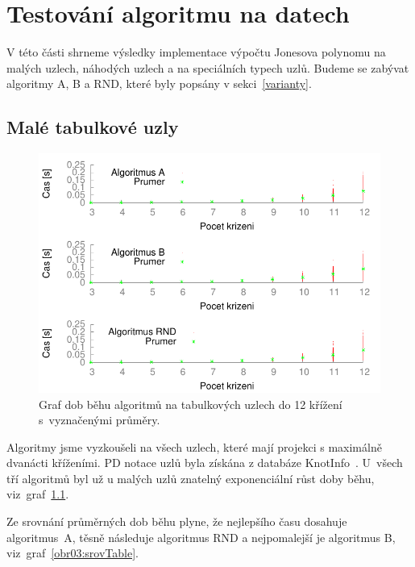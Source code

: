 
\chapter{Testování algoritmu na datech}

V této části shrneme výsledky implementace výpočtu Jonesova polynomu na malých uzlech, náhodých uzlech a na speciálních typech uzlů.
Budeme se zabývat algoritmy A, B a RND, které byly popsány v sekci~\ref{varianty}.

\section{Malé tabulkové uzly}

\begin{figure}[p]\centering
\includegraphics{../img/multiTable}
\caption{Graf dob běhu algoritmů na tabulkových uzlech do 12 křížení s~vyznačenými průměry.}
\label{obr03:multiTable}
\end{figure}

Algoritmy jsme vyzkoušeli na všech uzlech, které mají projekci s maximálně dvanácti kříženími. PD notace uzlů byla získána z databáze KnotInfo~\cite{knotinfo}.
U~všech tří algoritmů byl už u malých uzlů znatelný exponenciální růst doby běhu, viz~graf~\ref{obr03:multiTable}. 

Ze srovnání průměrných dob běhu plyne, že nejlepšího času dosahuje algoritmus~A, těsně následuje algoritmus RND a nejpomalejší je algoritmus B, viz~graf~\ref{obr03:srovTable}. 
	
